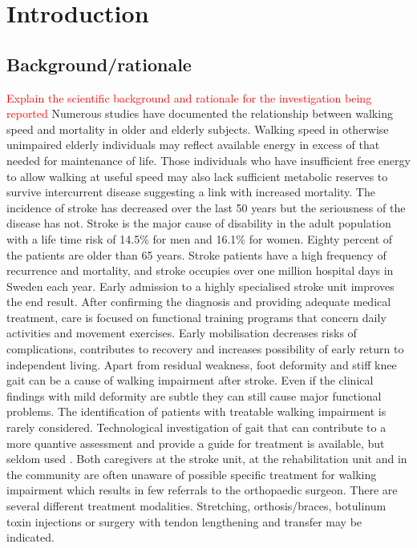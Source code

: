 \documentclass[a4paper,12pt]{article}
\begin{document}
\section{Introduction}
\subsection{Background/rationale} \textcolor{red}{Explain the scientific background and rationale 
for the investigation being reported} Numerous studies have documented the relationship between walking speed and mortality in older and elderly subjects\cite{Dumurgier2009,Stanaway2011,Elbaz2013}. Walking speed in otherwise unimpaired elderly individuals may reflect available energy in excess of that needed for maintenance of life\cite{Schrack2010}. Those individuals who have insufficient free energy to allow walking at useful speed may also lack sufficient metabolic reserves to survive intercurrent disease suggesting a link with increased mortality. 
The incidence of stroke has decreased over the last 50 years but the seriousness of the disease has not. Stroke is the major cause of disability in the adult population with a life time risk of 14.5\% for men and 16.1\% for women\cite{Carandang2006}. Eighty percent of the patients are older than 65 years. Stroke patients have a high frequency of recurrence and mortality, and stroke occupies over one million hospital days in Sweden each year. Early admission to a highly specialised stroke unit improves the end result. After confirming the diagnosis and providing adequate medical treatment, care is focused on functional training programs that concern daily activities and movement exercises. Early mobilisation decreases risks of complications, contributes to recovery and increases possibility of early return to independent living\cite {Indredavik1998,Joergensen1999d}.
Apart from residual weakness, foot deformity and stiff knee gait can be a cause of walking impairment after stroke. Even if the clinical findings with mild deformity are subtle they can still cause major functional problems. The identification of patients with treatable walking impairment is rarely considered. Technological investigation of gait that can contribute to a more quantive assessment and provide a guide for treatment is available, but seldom used \cite{Cooper1999j,Fuller2002,Patrick2007}. 
Both caregivers at the stroke unit, at the rehabilitation unit and in the community are often unaware of possible specific treatment for walking impairment which results in few referrals to the orthopaedic surgeon. There are several different treatment modalities. Stretching, orthosis/braces, botulinum toxin injections or surgery with tendon lengthening and transfer may be indicated\cite{Cooper1999j,Leroux2005a,Morita1998e,Pinzur1986,Reddy2008,Stoquart2008,Bayram2006a}.
\end{document}
